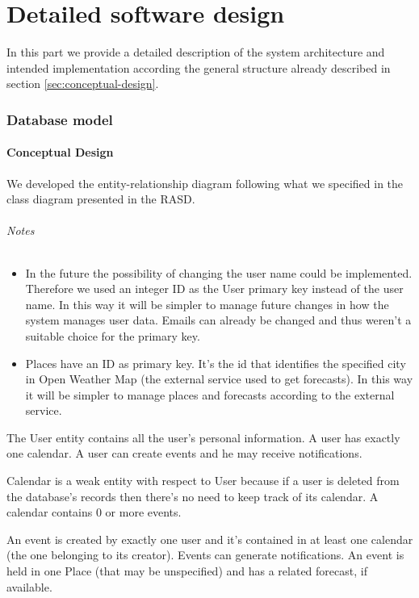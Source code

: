 \documentclass[10pt,a4paper,titlepage]{article}
\begin{document}
\clearpage
\part{Detailed software design}
\label{part:detailed-software-design}
In this part we provide a detailed description of the system architecture and intended implementation according the general structure already described in section \ref{sec:conceptual-design}.

\section{Database model}
\label{sec:DatabaseModel}
\subsection{Conceptual Design}
We developed the entity-relationship diagram following what we specified in the class diagram presented in the RASD. 
\paragraph{Notes}
\begin{itemize}
\item In the future the possibility of changing the user name could be implemented. Therefore we used an integer ID as the User primary key instead of the user name. In this way it will be simpler to manage future changes in how the system manages user data. 
Emails can already be changed and thus weren't a suitable choice for the primary key.
\item Places have an ID as primary key. It's the id that identifies the specified city in Open Weather Map (the external service used to get forecasts). In this way it will be simpler to manage places and forecasts according to the external service.   
\end{itemize}

The User entity contains all the  user's personal information. A user has exactly one calendar. A user can create events and he may receive notifications.

Calendar is a weak entity with respect to User because if a user is deleted from the database's records then there's no need  to keep track of its calendar. A calendar contains 0 or more events.

An event is created by exactly one user and it's contained in at least one calendar (the one belonging to its creator). Events can generate notifications. An event is held in one Place (that may be unspecified) and has a related forecast, if available.
\end{document}
